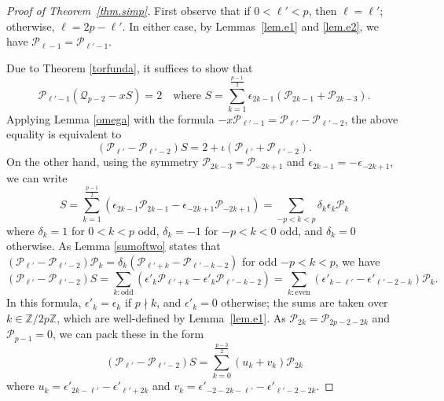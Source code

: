 \documentclass{amsart}
\def\calP{\mathcal{P}}
\def\calQ{\mathcal{Q}}
\theoremstyle{definition}
\begin{document}
\begin{proof}[Proof of Theorem~\ref{thm.simp}]
First observe that if $0 < \ell' < p$, then $\ell = \ell'$; otherwise, $\ell = 2p - \ell'$. In either case, by Lemmas~\ref{lem.e1} and \ref{lem.e2}, we have $\calP_{\ell-1} = \calP_{\ell'-1}$.

Due to Theorem \ref{torfunda}, it suffices to show that 
\begin{equation*}
    \calP_{\ell'-1}(\calQ_{p-2}-xS)=2 \quad \text{where } S=\sum_{k=1}^{\frac{p-1}{2}}\epsilon_{2k-1}(\calP_{2k-1}+\calP_{2k-3}) .
\end{equation*}
Applying Lemma \ref{omega} with the formula $-x \calP_{\ell'-1}=\calP_{\ell'}-\calP_{\ell'-2}$, the above equality is equivalent to
\begin{equation}
\label{eqn.goal}
    (\calP_{\ell'}-\calP_{\ell'-2})S=2+\iota(\calP_{\ell'}+\calP_{\ell'-2}).
\end{equation}
On the other hand, using the symmetry $\calP_{2k-3}=\calP_{-2k+1}$ and $\epsilon_{2k-1}=-\epsilon_{-2k+1}$, we can write 
\begin{equation*}
S= \sum_{k=1}^{\frac{p-1}{2}}(\epsilon_{2k-1}\calP_{2k-1}-\epsilon_{-2k+1}\calP_{-2k+1}) 
= \sum_{-p <k<p} \delta_k \epsilon_k \calP_k 
\end{equation*}
where $\delta_k=1$ for $0<k<p$ odd, $\delta_k=-1$ for $-p<k<0$ odd, and $\delta_k=0$ otherwise. As Lemma \ref{sumoftwo} states that $(\calP_{\ell'}-\calP_{\ell'-2})\calP_k=\delta_k(\calP_{\ell'+k}-\calP_{\ell'-k-2})$ for odd $-p<k<p$, we have
\begin{equation*}
  (\calP_{\ell'}-\calP_{\ell'-2})S=\sum_{k:\text{odd}}(\epsilon'_k \calP_{\ell'+k}-\epsilon'_k \calP_{\ell'-k-2})=\sum_{k:\text{even}}(\epsilon'_{k-\ell'}-\epsilon'_{\ell'-2-k})\calP_k.  
\end{equation*}
In this formula, $\epsilon'_k = \epsilon_k$ if $p \nmid k$, and $\epsilon'_k = 0$ otherwise; the sums are taken over $k \in \mathbb{Z}/2p\mathbb{Z}$, which are well-defined by Lemma~\ref{lem.e1}. As $\calP_{2k}=\calP_{2p-2-2k}$ and $\calP_{p-1}=0$, we can pack these in the form 
\begin{equation}
\label{eqn.goal2}
    (\calP_{\ell'}-\calP_{\ell'-2})S=\sum_{k=0}^{\frac{p-3}{2}}(u_k +v_k)\calP_{2k}
\end{equation} 
where $u_k=\epsilon'_{2k-\ell'}-\epsilon'_{\ell'+2k}$ and $v_k=\epsilon'_{-2-2k-\ell'}-\epsilon'_{\ell'-2-2k}$.


\end{proof}
\end{document}

